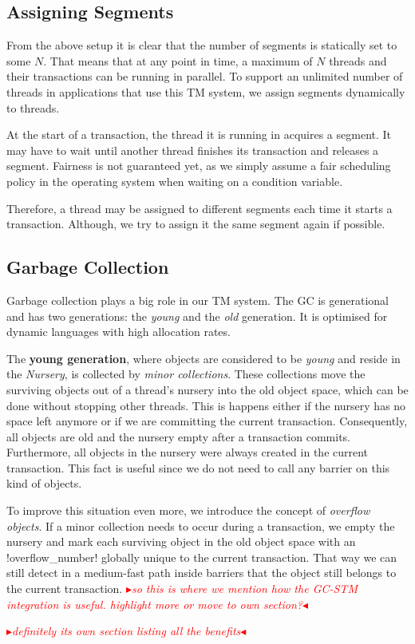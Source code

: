 \documentclass{sigplanconf}
\makeatletter
\renewcommand\lstinline[1][]{%
  \Collectverb{\@@myverb}%
}
\def\@@myverb#1{%
    \begingroup
    \fboxsep=0.2em
    \colorbox{verylightgray}{\oldlstinline|#1|}%
    \endgroup
}
\newcommand{\mynote}[2]{%
  \textcolor{red}{%
    \fbox{\bfseries\sffamily\scriptsize#1}%
    {\small$\blacktriangleright$\textsf{\emph{#2}}$\blacktriangleleft$}%
  }%
}
\newcommand\remi[1]{\mynote{Remi}{#1}}
\newcommand\cfbolz[1]{\mynote{cfbolz}{#1}}
\makeatother
\begin{document}
\subsection{Assigning Segments}

From the above setup it is clear that the number of segments is
statically set to some $N$. That means that at any point in time, a
maximum of $N$ threads and their transactions can be running in
parallel.  To support an unlimited number of threads in applications
that use this TM system, we assign segments dynamically to threads.

At the start of a transaction, the thread it is running in acquires a
segment. It may have to wait until another thread finishes its
transaction and releases a segment. Fairness is not guaranteed yet, as
we simply assume a fair scheduling policy in the operating system when
waiting on a condition variable.

Therefore, a thread may be assigned to different segments each time it
starts a transaction. Although, we try to assign it the same segment
again if possible.




\subsection{Garbage Collection}

Garbage collection plays a big role in our TM system. The GC is
generational and has two generations: the \emph{young} and the
\emph{old} generation. It is optimised for dynamic languages with
high allocation rates.

The \textbf{young generation}, where objects are considered to be
\emph{young} and reside in the \emph{Nursery}, is collected by
\emph{minor collections}. These collections move the surviving objects
out of a thread's nursery into the old object space, which can be done
without stopping other threads. This is happens either if the nursery has
no space left anymore or if we are committing the current
transaction. Consequently, all objects are old and the nursery empty
after a transaction commits.  Furthermore, all objects in the nursery
were always created in the current transaction. This fact is useful
since we do not need to call any barrier on this kind of objects.

To improve this situation even more, we introduce the concept of
\emph{overflow objects}. If a minor collection needs to occur during a
transaction, we empty the nursery and mark each surviving object in
the old object space with an \lstinline!overflow_number!  globally
unique to the current transaction. That way we can still detect in a
medium-fast path inside barriers that the object still belongs to the
current transaction. \remi{so this is where we mention how the GC-STM
integration is useful. highlight more or move to own section?}
\cfbolz{definitely its own section listing all the benefits}
\end{document}
